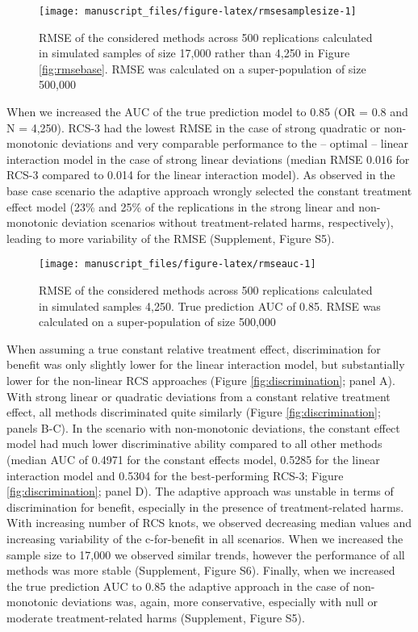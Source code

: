 \documentclass[]{elsarticle} %
\begin{document}
\begin{figure}
\texttt{[image: manuscript\_files/figure-latex/rmsesamplesize-1]} \caption{RMSE of the considered methods across 500 replications calculated in simulated samples of size 17,000 rather than 4,250 in Figure \ref{fig:rmsebase}. RMSE was calculated on a super-population of size 500,000}\label{fig:rmsesamplesize}
\end{figure}

When we increased the AUC of the true prediction model to 0.85 (OR = 0.8
and N = 4,250). RCS-3 had the lowest RMSE in the case of strong
quadratic or non-monotonic deviations and very comparable performance to
the -- optimal -- linear interaction model in the case of strong linear
deviations (median RMSE 0.016 for RCS-3 compared to 0.014 for the linear
interaction model). As observed in the base case scenario the adaptive
approach wrongly selected the constant treatment effect model (23\% and
25\% of the replications in the strong linear and non-monotonic
deviation scenarios without treatment-related harms, respectively),
leading to more variability of the RMSE (Supplement, Figure S5).

\begin{figure}
\texttt{[image: manuscript\_files/figure-latex/rmseauc-1]} \caption{RMSE of the considered methods across 500 replications calculated in simulated samples 4,250. True prediction AUC of 0.85. RMSE was calculated on a super-population of size 500,000}\label{fig:rmseauc}
\end{figure}

When assuming a true constant relative treatment effect, discrimination
for benefit was only slightly lower for the linear interaction model,
but substantially lower for the non-linear RCS approaches (Figure
\ref{fig:discrimination}; panel A). With strong linear or quadratic
deviations from a constant relative treatment effect, all methods
discriminated quite similarly (Figure \ref{fig:discrimination}; panels
B-C). In the scenario with non-monotonic deviations, the constant effect
model had much lower discriminative ability compared to all other
methods (median AUC of 0.4971 for the constant effects model, 0.5285 for
the linear interaction model and 0.5304 for the best-performing RCS-3;
Figure \ref{fig:discrimination}; panel D). The adaptive approach was
unstable in terms of discrimination for benefit, especially in the
presence of treatment-related harms. With increasing number of RCS
knots, we observed decreasing median values and increasing variability
of the c-for-benefit in all scenarios. When we increased the sample size
to 17,000 we observed similar trends, however the performance of all
methods was more stable (Supplement, Figure S6). Finally, when we
increased the true prediction AUC to 0.85 the adaptive approach in the
case of non-monotonic deviations was, again, more conservative,
especially with null or moderate treatment-related harms (Supplement,
Figure S5).
\end{document}
